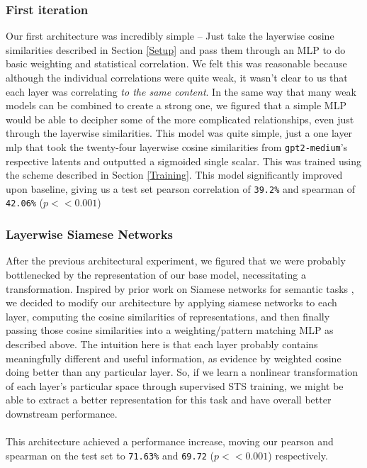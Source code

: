 \documentclass[14pt]{article}
\begin{document}
\subsubsection{First iteration}
Our first architecture was incredibly simple -- Just take the layerwise cosine similarities described in Section \ref {Setup} and pass them through an MLP to do basic weighting and statistical correlation. We felt this was reasonable because although the individual correlations were quite weak, it wasn't clear to us that each layer was correlating \textit{to the same content}. In the same way that many weak models can be combined to create a strong one, we figured that a simple MLP would be able to decipher some of the more complicated relationships, even just through the layerwise similarities. This model was quite simple, just a one layer mlp that took the twenty-four layerwise cosine similarities from \verb|gpt2-medium|'s respective latents and outputted a sigmoided single scalar. This was trained using the scheme described in Section \ref{Training}. This model significantly improved upon baseline, giving us a test set pearson correlation of \verb|39.2%| and spearman of \verb|42.06%| ($p<< 0.001$)

\subsubsection{Layerwise Siamese Networks}
After the previous architectural experiment, we figured that we were probably bottlenecked by the representation of our base model, necessitating a transformation. Inspired by prior work on Siamese networks for semantic tasks \cite{reimers2019sentencebertsentenceembeddingsusing}, we decided to modify our architecture by applying siamese networks to each layer, computing the cosine similarities of  representations, and then finally passing those cosine similarities into a weighting/pattern matching MLP as described above. The intuition here is that each layer probably contains meaningfully different and useful information, as evidence by weighted cosine doing better than any particular layer. So, if we learn a nonlinear transformation of each layer's particular space through supervised STS training, we might be able to extract a better representation for this task and have overall better downstream performance.\\\\
This architecture achieved a  performance increase, moving our pearson and spearman on the test set to \verb|71.63%| and \verb|69.72| ($p << 0.001$) respectively.
\end{document}
